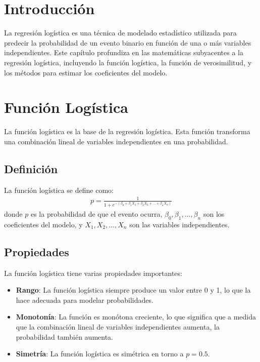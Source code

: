 \section{Introducci\'on}

La regresi\'on log\'istica es una t\'ecnica de modelado estad\'istico utilizada para predecir la probabilidad de un evento binario en funci\'on de una o m\'as variables independientes. Este cap\'itulo profundiza en las matem\'aticas subyacentes a la regresi\'on log\'istica, incluyendo la funci\'on log\'istica, la funci\'on de verosimilitud, y los m\'etodos para estimar los coeficientes del modelo.

\section{Funci\'on Log\'istica}

La funci\'on log\'istica es la base de la regresi\'on log\'istica. Esta funci\'on transforma una combinaci\'on lineal de variables independientes en una probabilidad.

\subsection{Definici\'on}

La funci\'on log\'istica se define como:
\begin{eqnarray*}
p = \frac{1}{1 + e^{-(\beta_0 + \beta_1 X_1 + \beta_2 X_2 + \ldots + \beta_n X_n)}}
\end{eqnarray*}
donde $p$ es la probabilidad de que el evento ocurra, $\beta_0, \beta_1, \ldots, \beta_n$ son los coeficientes del modelo, y $X_1, X_2, \ldots, X_n$ son las variables independientes.

\subsection{Propiedades}

La funci\'on log\'istica tiene varias propiedades importantes:
\begin{itemize}
    \item \textbf{Rango}: La funci\'on log\'istica siempre produce un valor entre 0 y 1, lo que la hace adecuada para modelar probabilidades.
    \item \textbf{Monoton\'ia}: La funci\'on es mon\'otona creciente, lo que significa que a medida que la combinaci\'on lineal de variables independientes aumenta, la probabilidad tambi\'en aumenta.
    \item \textbf{Simetr\'ia}: La funci\'on log\'istica es sim\'etrica en torno a $p = 0.5$.
\end{itemize}

